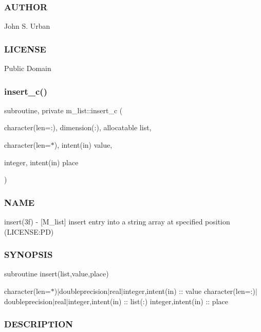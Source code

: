 \subsubsection*{A\+U\+T\+H\+OR}

John S. Urban \subsubsection*{L\+I\+C\+E\+N\+SE}

Public Domain \mbox{\label{namespacem__list_ac9b841bea6c2cfed1608b2809aaf07b4}} 
\subsubsection{\texorpdfstring{insert\+\_\+c()}{insert\_c()}}
{\footnotesize\ttfamily subroutine, private m\+\_\+list\+::insert\+\_\+c (\begin{DoxyParamCaption}\item[{character(len=\+:), dimension(\+:), allocatable}]{list,  }\item[{character(len=$\ast$), intent(in)}]{value,  }\item[{integer, intent(in)}]{place }\end{DoxyParamCaption})\hspace{0.3cm}{\ttfamily [private]}}



\subsubsection*{N\+A\+ME}

insert(3f) -\/ \mbox{[}M\+\_\+list\mbox{]} insert entry into a string array at specified position (L\+I\+C\+E\+N\+SE\+:PD) 

\subsubsection*{S\+Y\+N\+O\+P\+S\+IS}

subroutine insert(list,value,place)

character(len=$\ast$)$\vert$doubleprecision$\vert$real$\vert$integer,intent(in) \+:\+: value character(len=\+:)$\vert$doubleprecision$\vert$real$\vert$integer,intent(in) \+:\+: list(\+:) integer,intent(in) \+:\+: place

\subsubsection*{D\+E\+S\+C\+R\+I\+P\+T\+I\+ON}

